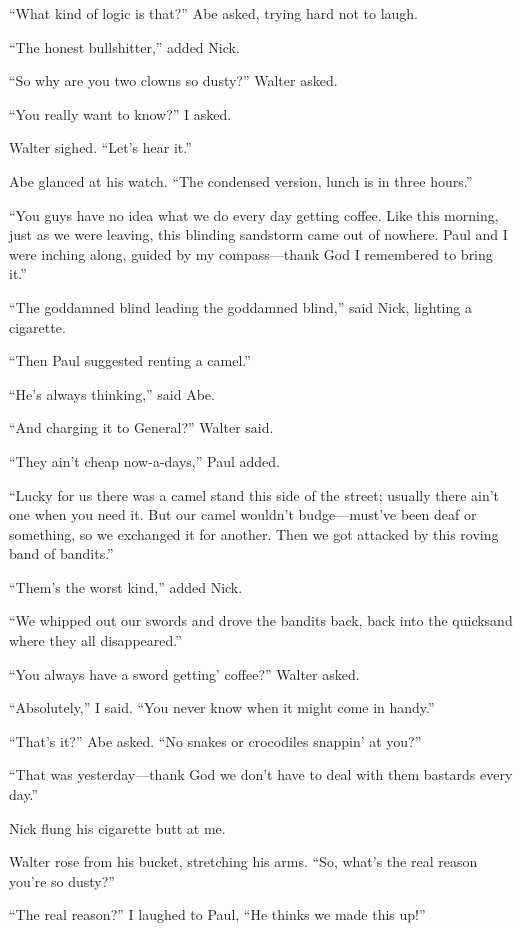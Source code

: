 ``What kind of logic is that?'' Abe asked, trying hard not to laugh.

``The honest bullshitter,'' added Nick.

``So why are you two clowns so dusty?'' Walter asked.

``You really want to know?'' I asked.

Walter sighed. ``Let's hear it.''

Abe glanced at his watch. ``The condensed version, lunch is in three
hours.''

``You guys have no idea what we do every day getting coffee. Like this
morning, just as we were leaving, this blinding sandstorm came out of
nowhere. Paul and I were inching along, guided by my compass---thank God
I remembered to bring it.''

``The goddamned blind leading the goddamned blind,'' said Nick, lighting
a cigarette.

``Then Paul suggested renting a camel.''

``He's always thinking,'' said Abe.

``And charging it to General?'' Walter said.

``They ain't cheap now-a-days,'' Paul added.

``Lucky for us there was a camel stand this side of the street; usually
there ain't one when you need it. But our camel wouldn't budge---must've
been deaf or something, so we exchanged it for another. Then we got
attacked by this roving band of bandits.''

``Them's the worst kind,'' added Nick.

``We whipped out our swords and drove the bandits back, back into the
quicksand where they all disappeared.''

``You always have a sword getting' coffee?'' Walter asked.

``Absolutely,'' I said. ``You never know when it might come in handy.''

``That's it?'' Abe asked. ``No snakes or crocodiles snappin' at you?''

``That was yesterday---thank God we don't have to deal with them
bastards every day.''

Nick flung his cigarette butt at me.

Walter rose from his bucket, stretching his arms. ``So, what's the real
reason you're so dusty?''

``The real reason?'' I laughed to Paul, ``He thinks we made this up!''

